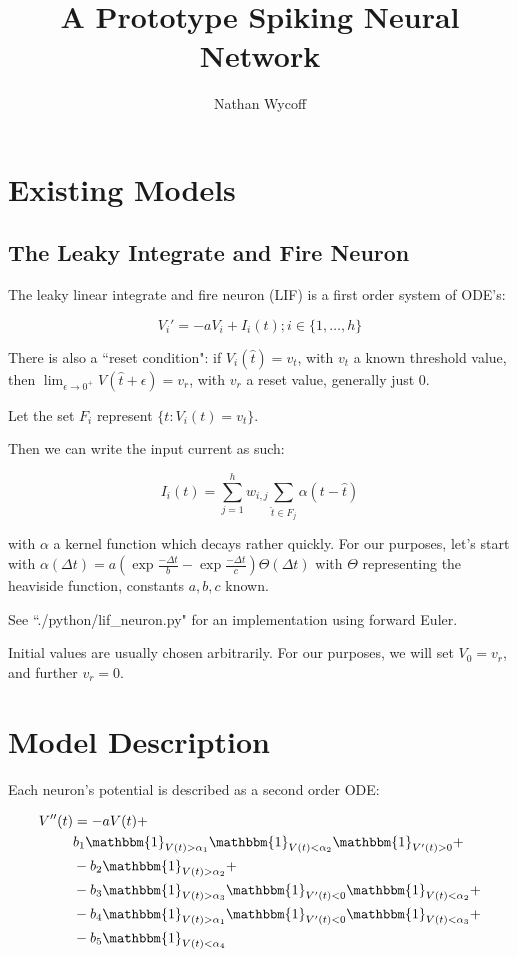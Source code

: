 \documentclass[a4paper]{article}
\title{A Prototype Spiking Neural Network}
\author{Nathan Wycoff}
\begin{document}
\maketitle

\section{Existing Models}

\subsection{The Leaky Integrate and Fire Neuron}

The leaky linear integrate and fire neuron (LIF) is a first order system of ODE's:

$$
V_i' = -aV_i + I_i(t); i \in \{1, \ldots, h\}
$$

There is also a ``reset condition": if $V_i (\hat{t})= v_t$, with $v_t$ a known threshold value, then $\lim_{\epsilon\to 0^+} V(\hat{t} + \epsilon) = v_r$, with $v_r$ a reset value, generally just 0.

Let the set $F_i$ represent $\{t : V_i(t) = v_t\}$.

Then we can write the input current as such:

$$
I_i(t)= \sum_{j=1}^h w_{i,j} \sum_{\hat{t} \in F_j} \alpha(t - \hat{t})
$$

with $\alpha$ a kernel function which decays rather quickly. For our purposes, let's start with $\alpha(\Delta t) = a (\exp{\frac{-\Delta t}{b}} - \exp{\frac{-\Delta t}{c}}) \Theta(\Delta t)$ with $\Theta$ representing the heaviside function, constants $a, b, c$ known.

See ``./python/lif\_neuron.py" for an implementation using forward Euler.

Initial values are usually chosen arbitrarily. For our purposes, we will set $V_0 = v_r$, and further $v_r = 0$.

\section{Model Description}

Each neuron's potential is described as a second order ODE:

\begin{equation} \label{eq1}
\begin{split}
V''(t) & = -aV(t) + \\
 & b_1 \mathbbm{1}_{V(t) > \alpha_1}\mathbbm{1}_{V(t) < \alpha_2}\mathbbm{1}_{V'(t) > 0} + \\
& -b_2 \mathbbm{1}_{V(t) > \alpha_2} + \\
& -b_3 \mathbbm{1}_{V(t) > \alpha_3} \mathbbm{1}_{V'(t) < 0} \mathbbm{1}_{V(t) < \alpha_2} + \\
& -b_4 \mathbbm{1}_{V(t) > \alpha_1} \mathbbm{1}_{V'(t) < 0} \mathbbm{1}_{V(t) < \alpha_3} + \\
& -b_5 \mathbbm{1}_{V(t) < \alpha_4} 
\end{split}
\end{equation}
\end{document}
